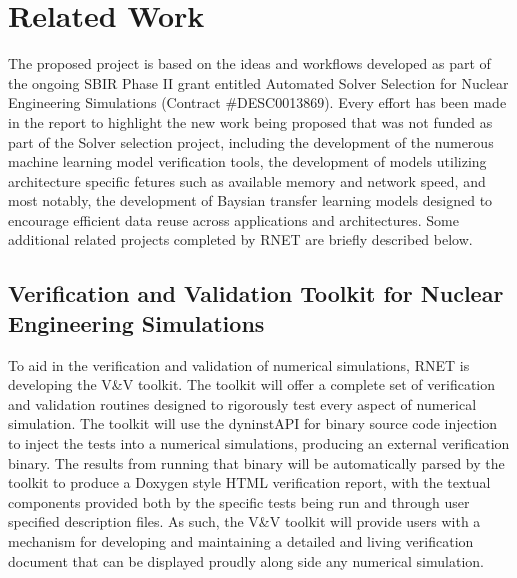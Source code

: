 
\section{Related Work}
\label{related}

The proposed project is based on the ideas and workflows developed as part of the ongoing SBIR Phase II grant entitled Automated Solver Selection for Nuclear Engineering Simulations (Contract \#DESC0013869). Every effort has been made in the report to highlight the new work being proposed that was not funded as part of the Solver selection project, including the development of the numerous machine learning model verification tools, the development of models utilizing architecture specific fetures such as available memory and network speed, and most notably, the development of Baysian transfer learning models designed to encourage efficient data reuse across applications and architectures. Some additional related projects completed by RNET are briefly described below. 

\subsection{Verification and Validation Toolkit for Nuclear Engineering Simulations} 
  To aid in the verification and validation of numerical simulations, RNET is developing the V\&V toolkit. The toolkit will offer a complete set of verification and validation routines designed to rigorously test every aspect of numerical simulation. The toolkit will use the dyninstAPI for binary source code injection to inject the tests into a numerical simulations, producing an external verification binary. The results from running that binary will be automatically parsed by the toolkit to produce a Doxygen style HTML verification report, with the textual components provided both by the specific tests being run and through user specified description files. As such, the V\&V toolkit will provide users with a mechanism for developing and maintaining a detailed and living verification document that can be displayed proudly along side any numerical simulation.     

